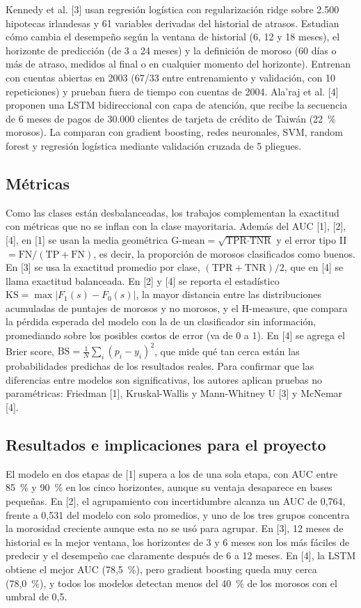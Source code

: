 \documentclass[journal]{IEEEtran}
\begin{document}
Kennedy et al. [3] usan regresión logística con regularización ridge sobre 2.500 hipotecas irlandesas y 61 variables derivadas del historial de atrasos. Estudian cómo cambia el desempeño según la ventana de historial (6, 12 y 18 meses), el horizonte de predicción (de 3 a 24 meses) y la definición de moroso (60 días o más de atraso, medidos al final o en cualquier momento del horizonte). Entrenan con cuentas abiertas en 2003 (67/33 entre entrenamiento y validación, con 10 repeticiones) y prueban fuera de tiempo con cuentas de 2004. Ala'raj et al. [4] proponen una LSTM bidireccional con capa de atención, que recibe la secuencia de 6 meses de pagos de 30.000 clientes de tarjeta de crédito de Taiwán (22~\% morosos). La comparan con gradient boosting, redes neuronales, SVM, random forest y regresión logística mediante validación cruzada de 5 pliegues.

\subsection{Métricas}

Como las clases están desbalanceadas, los trabajos complementan la exactitud con métricas que no se inflan con la clase mayoritaria. Además del AUC [1], [2], [4], en [1] se usan la media geométrica $\text{G-mean}=\sqrt{\text{TPR}\cdot\text{TNR}}$ y el error tipo II $=\text{FN}/(\text{TP}+\text{FN})$, es decir, la proporción de morosos clasificados como buenos. En [3] se usa la exactitud promedio por clase, $(\text{TPR}+\text{TNR})/2$, que en [4] se llama exactitud balanceada. En [2] y [4] se reporta el estadístico $\text{KS}=\max|F_1(s)-F_0(s)|$, la mayor distancia entre las distribuciones acumuladas de puntajes de morosos y no morosos, y el H-measure, que compara la pérdida esperada del modelo con la de un clasificador sin información, promediando sobre los posibles costos de error (va de 0 a 1). En [4] se agrega el Brier score, $\text{BS}=\frac{1}{N}\sum_i(p_i-y_i)^2$, que mide qué tan cerca están las probabilidades predichas de los resultados reales. Para confirmar que las diferencias entre modelos son significativas, los autores aplican pruebas no paramétricas: Friedman [1], Kruskal-Wallis y Mann-Whitney U [3] y McNemar [4].

\subsection{Resultados e implicaciones para el proyecto}

El modelo en dos etapas de [1] supera a los de una sola etapa, con AUC entre 85~\% y 90~\% en los cinco horizontes, aunque su ventaja desaparece en bases pequeñas. En [2], el agrupamiento con incertidumbre alcanza un AUC de 0,764, frente a 0,531 del modelo con solo promedios, y uno de los tres grupos concentra la morosidad creciente aunque esta no se usó para agrupar. En [3], 12 meses de historial es la mejor ventana, los horizontes de 3 y 6 meses son los más fáciles de predecir y el desempeño cae claramente después de 6 a 12 meses. En [4], la LSTM obtiene el mejor AUC (78,5~\%), pero gradient boosting queda muy cerca (78,0~\%), y todos los modelos detectan menos del 40~\% de los morosos con el umbral de 0,5.
\end{document}
